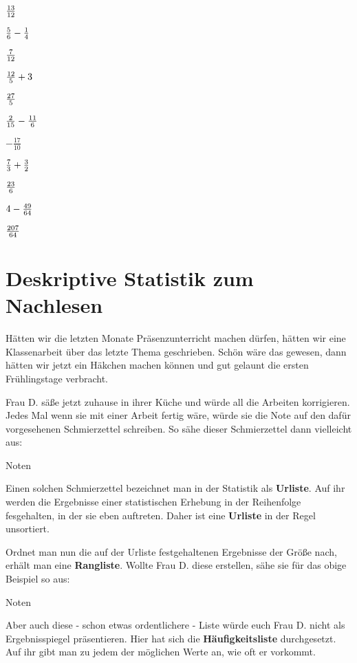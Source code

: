 \documentclass[
  ngerman,
]{book}
\begin{document}
\leavevmode\hypertarget{toggleText23}{}%
\(13 \over 12\)

\({5 \over 6}-{1 \over 4}\)

\leavevmode\hypertarget{toggleText24}{}%
\(7 \over 12\)

\({12 \over 5}+3\)

\leavevmode\hypertarget{toggleText25}{}%
\(27 \over 5\)

\({2 \over 15}-{11 \over 6}\)

\leavevmode\hypertarget{toggleText26}{}%
\(-{\frac{17}{10}}\)

\({7 \over 3}+{3 \over 2}\)

\leavevmode\hypertarget{toggleText27}{}%
\(23 \over 6\)

\(4-{49 \over 64}\)

\leavevmode\hypertarget{toggleText28}{}%
\(207 \over 64\)

\hypertarget{deskriptive-statistik-zum-nachlesen}{%
\section*{Deskriptive Statistik zum Nachlesen}\label{deskriptive-statistik-zum-nachlesen}}

Hätten wir die letzten Monate Präsenzunterricht machen dürfen, hätten wir eine Klassenarbeit über das letzte Thema geschrieben. Schön wäre das gewesen, dann hätten wir jetzt ein Häkchen machen können und gut gelaunt die ersten Frühlingstage verbracht.

Frau D. säße jetzt zuhause in ihrer Küche und würde all die Arbeiten korrigieren. Jedes Mal wenn sie mit einer Arbeit fertig wäre, würde sie die Note auf den dafür vorgesehenen Schmierzettel schreiben. So sähe dieser Schmierzettel dann vielleicht aus:

Noten

Einen solchen Schmierzettel bezeichnet man in der Statistik als \textbf{Urliste}. Auf ihr werden die Ergebnisse einer statistischen Erhebung in der Reihenfolge fesgehalten, in der sie eben auftreten. Daher ist eine \textbf{Urliste} in der Regel unsortiert.

Ordnet man nun die auf der Urliste festgehaltenen Ergebnisse der Größe nach, erhält man eine \textbf{Rangliste}. Wollte Frau D. diese erstellen, sähe sie für das obige Beispiel so aus:

Noten

Aber auch diese - schon etwas ordentlichere - Liste würde euch Frau D. nicht als Ergebnisspiegel präsentieren. Hier hat sich die \textbf{Häufigkeitsliste} durchgesetzt. Auf ihr gibt man zu jedem der möglichen Werte an, wie oft er vorkommt.
\end{document}

